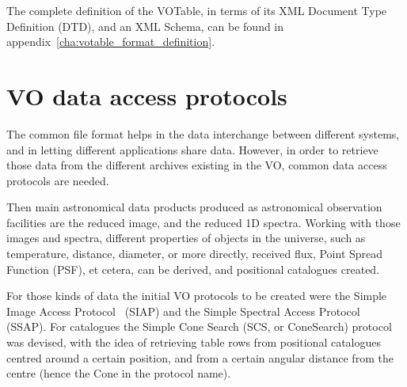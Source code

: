 			The complete definition of the VOTable, in terms of its
			XML Document Type Definition (DTD), and an XML Schema,
			can be found in
			appendix~\ref{cha:votable_format_definition}.
		





	\section{VO data access protocols} %
	\label{sec:vo_data_access_protocols}
		
		The common file format helps in the data interchange
		between different systems, and in letting different
		applications share data. However, in order to retrieve
		those data from the different archives existing in the VO,
		common data access protocols are needed.
		
		 Then main astronomical data products produced as
		astronomical observation facilities are the reduced image,
		and the reduced 1D spectra. Working with those images and
		spectra, different properties of objects in the universe,
		such as temperature, distance, diameter, or more directly,
		received flux, Point Spread Function (PSF), et cetera, can
		be derived, and positional catalogues created.
		
		 For those kinds of data the initial VO protocols to be
		created were the Simple Image Access
		Protocol~\cite{2008sia..rprt.....T} (SIAP) and the Simple
		Spectral Access
		Protocol~\cite{Tody:2007yq,2004SPIE.5493..262D} (SSAP). For
		catalogues the Simple Cone Search (SCS, or ConeSearch)
		protocol~\cite{Williams:2008fv} was devised, with the idea
		of retrieving table rows from positional catalogues centred
		around a certain position, and from a certain angular
		distance from the centre (hence the Cone in the protocol
		name).
		
